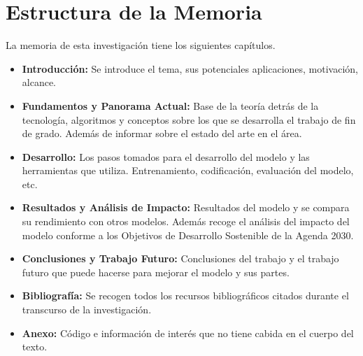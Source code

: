 \section{Estructura de la Memoria}
\label{sec:estructuramemoria}
La memoria de esta investigación tiene los siguientes capítulos.
\begin{itemize}
	\item \textbf{Introducción: } Se introduce el tema, sus potenciales aplicaciones, motivación, alcance. 
	\item \textbf{Fundamentos y Panorama Actual: } Base de la teoría detrás de la tecnología, algoritmos y conceptos sobre los que se desarrolla el trabajo de fin de grado. Además de informar sobre el estado del arte en el área.
	\item \textbf{Desarrollo: } Los pasos tomados para el desarrollo del modelo y las herramientas que utiliza. Entrenamiento, codificación, evaluación del modelo, etc. 
	\item \textbf{Resultados y Análisis de Impacto: } Resultados del modelo y se compara su rendimiento con otros modelos. Además recoge el análisis del impacto del modelo conforme a los Objetivos de Desarrollo Sostenible de la Agenda 2030.
	\item \textbf{Conclusiones y Trabajo Futuro: } Conclusiones del trabajo y el trabajo futuro que puede hacerse para mejorar el modelo y sus partes. 
	\item \textbf{Bibliografía: } Se recogen todos los recursos bibliográficos citados durante el transcurso de la investigación.
	\item \textbf{Anexo: } Código e información de interés que no tiene cabida en el cuerpo del texto. 
\end{itemize}



